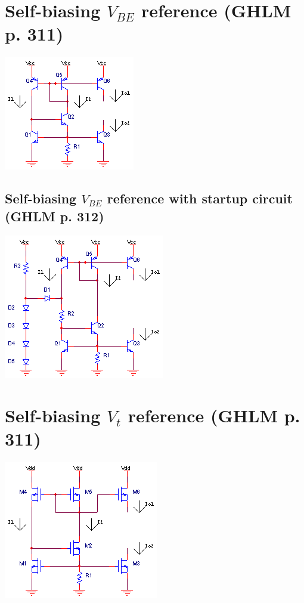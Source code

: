 \section{Self-biasing $V_{BE}$ reference (GHLM p. 311)}
\begin{center}
	\includegraphics{schematics/self-biasing_Vbe_reference.PNG}
\end{center}

\subsection{Self-biasing $V_{BE}$ reference with startup circuit (GHLM p. 312)}
\begin{center}
	\includegraphics{schematics/self-biasing_Vbe_reference_startup.PNG}
\end{center}

\section{Self-biasing $V_{t}$ reference (GHLM p. 311)}
\begin{center}
	\includegraphics{schematics/self-biasing_Vt_reference.PNG}
\end{center}

